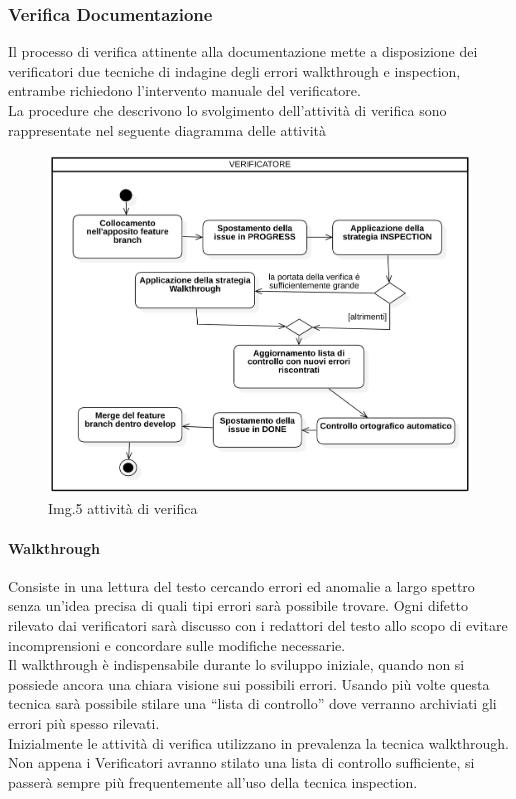 		\subsubsection{Verifica Documentazione}
			Il processo di verifica attinente alla documentazione mette a disposizione dei verificatori due tecniche di indagine degli errori walkthrough e inspection, entrambe richiedono l’intervento manuale del verificatore. \\
			La procedure che descrivono lo svolgimento dell’attività di verifica sono rappresentate nel seguente diagramma delle attività \\
			\begin{figure}[H]
    				\centering
    				\includegraphics[width=1.0\textwidth]{res/images/attivita_di_verifica.png}
				\caption{Img.5 attività di verifica}
				\label{fig:Img.5 attività di verifica}
			\end{figure}
			\paragraph{Walkthrough}
				Consiste in una lettura del testo cercando errori ed anomalie a largo spettro senza un’idea precisa di quali tipi errori sarà possibile trovare. Ogni difetto rilevato dai verificatori sarà discusso con i redattori del testo allo scopo di evitare incomprensioni e concordare sulle modifiche necessarie.\\
				Il walkthrough è indispensabile durante lo sviluppo iniziale, quando non si possiede ancora una chiara visione sui possibili errori. Usando più volte questa tecnica sarà possibile stilare una “lista di controllo” dove verranno archiviati gli errori più spesso rilevati. \\
				Inizialmente le attività di verifica utilizzano in prevalenza la tecnica walkthrough. Non appena i Verificatori avranno stilato una lista di controllo sufficiente, si passerà sempre più frequentemente all’uso della tecnica inspection.\\
